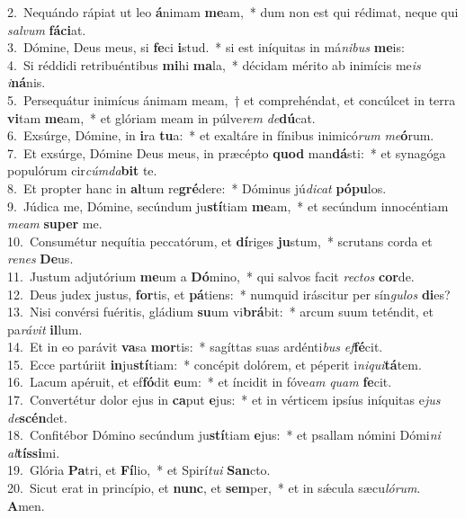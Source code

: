 {2.~}Nequándo rápiat ut leo \textbf{á}nimam \textbf{me}am,~* dum non est qui rédimat, neque qui \textit{sal}\textit{vum} \textbf{fá}\textbf{ci}at.\\
{3.~}Dómine, Deus meus, si \textbf{fe}ci \textbf{i}stud.~* si est iníquitas in má\textit{ni}\textit{bus} \textbf{me}is:\\
{4.~}Si réddidi retribuéntibus \textbf{mi}hi \textbf{ma}la,~* décidam mérito ab inimícis me\textit{is} \textit{i}\textbf{ná}nis.\\
{5.~}Persequátur inimícus ánimam meam,~† et comprehéndat, et concúlcet in terra \textbf{vi}tam \textbf{me}am,~* et glóriam meam in púlve\textit{rem} \textit{de}\textbf{dú}cat.\\
{6.~}Exsúrge, Dómine, in \textbf{i}ra \textbf{tu}a:~* et exaltáre in fínibus inimicó\textit{rum} \textit{me}\textbf{ó}rum.\\
{7.~}Et exsúrge, Dómine Deus meus, in præcépto \textbf{quod} man\textbf{dá}sti:~* et synagóga populórum cir\textit{cúm}\textit{da}\textbf{bit} te.\\
{8.~}Et propter hanc in \textbf{al}tum re\textbf{gré}dere:~* Dóminus jú\textit{di}\textit{cat} \textbf{pó}\textbf{pu}los.\\
{9.~}Júdica me, Dómine, secúndum ju\textbf{stí}tiam \textbf{me}am,~* et secúndum innocéntiam \textit{me}\textit{am} \textbf{su}\textbf{per} me.\\
{10.~}Consumétur nequítia peccatórum, et \textbf{dí}riges \textbf{ju}stum,~* scrutans corda et \textit{re}\textit{nes} \textbf{De}us.\\
{11.~}Justum adjutórium \textbf{me}um a \textbf{Dó}mino,~* qui salvos facit \textit{re}\textit{ctos} \textbf{cor}de.\\
{12.~}Deus judex justus, \textbf{for}tis, et \textbf{pá}tiens:~* numquid iráscitur per sín\textit{gu}\textit{los} \textbf{di}es?\\
{13.~}Nisi convérsi fuéritis, gládium \textbf{su}um vi\textbf{brá}bit:~* arcum suum teténdit, et pa\textit{rá}\textit{vit} \textbf{il}lum.\\
{14.~}Et in eo parávit \textbf{va}sa \textbf{mor}tis:~* sagíttas suas ardénti\textit{bus} \textit{ef}\textbf{fé}cit.\\
{15.~}Ecce partúriit \textbf{in}ju\textbf{stí}tiam:~* concépit dolórem, et péperit i\textit{ni}\textit{qui}\textbf{tá}tem.\\
{16.~}Lacum apéruit, et ef\textbf{fó}dit \textbf{e}um:~* et íncidit in fóve\textit{am} \textit{quam} \textbf{fe}cit.\\
{17.~}Convertétur dolor ejus in \textbf{ca}put \textbf{e}jus:~* et in vérticem ipsíus iníquitas e\textit{jus} \textit{de}\textbf{scén}det.\\
{18.~}Confitébor Dómino secúndum ju\textbf{stí}tiam \textbf{e}jus:~* et psallam nómini Dómi\textit{ni} \textit{al}\textbf{tís}\textbf{si}mi.\\
{19.~}Glória \textbf{Pa}tri, et \textbf{Fí}lio,~* et Spirí\textit{tu}\textit{i} \textbf{San}cto.\\
{20.~}Sicut erat in princípio, et \textbf{nunc}, et \textbf{sem}per,~* et in sǽcula sæcu\textit{ló}\textit{rum}. \textbf{A}men.\\

